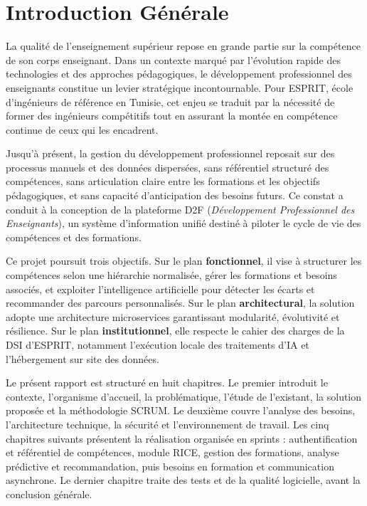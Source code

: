\documentclass[12pt,a4paper]{report}
\begin{document}
\clearpage
\chapter*{Introduction Générale}
\thispagestyle{plain}

La qualité de l'enseignement supérieur repose en grande partie sur la
compétence de son corps enseignant. Dans un contexte marqué par
l'évolution rapide des technologies et des approches pédagogiques, le
développement professionnel des enseignants constitue un levier
stratégique incontournable. Pour ESPRIT, école d'ingénieurs de référence
en Tunisie, cet enjeu se traduit par la nécessité de former des
ingénieurs compétitifs tout en assurant la montée en compétence continue
de ceux qui les encadrent.

Jusqu'à présent, la gestion du développement professionnel reposait sur
des processus manuels et des données dispersées, sans référentiel
structuré des compétences, sans articulation claire entre les formations
et les objectifs pédagogiques, et sans capacité d'anticipation des
besoins futurs. Ce constat a conduit à la conception de la plateforme
D2F (\textit{Développement Professionnel des Enseignants}), un système
d'information unifié destiné à piloter le cycle de vie des compétences
et des formations.

Ce projet poursuit trois objectifs. Sur le plan \textbf{fonctionnel},
il vise à structurer les compétences selon une hiérarchie normalisée, gérer
les formations et besoins associés, et exploiter l'intelligence
artificielle pour détecter les écarts et recommander des parcours
personnalisés. Sur le plan \textbf{architectural}, la solution adopte
une architecture microservices garantissant modularité, évolutivité et
résilience. Sur le plan \textbf{institutionnel}, elle respecte le cahier
des charges de la DSI d'ESPRIT, notamment l'exécution locale des
traitements d'IA et l'hébergement sur site des données.

Le présent rapport est structuré en huit chapitres. Le premier introduit
le contexte, l'organisme d'accueil, la problématique, l'étude de
l'existant, la solution proposée et la méthodologie SCRUM. Le deuxième
couvre l'analyse des besoins, l'architecture technique, la sécurité et
l'environnement de travail. Les cinq chapitres suivants présentent la
réalisation organisée en sprints : authentification et référentiel de
compétences, module RICE, gestion des formations, analyse prédictive et
recommandation, puis besoins en formation et communication asynchrone.
Le dernier chapitre traite des tests et de la qualité logicielle, avant
la conclusion générale.
\end{document}
